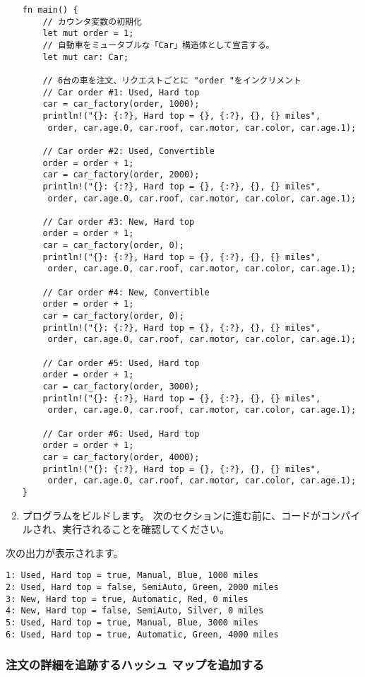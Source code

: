\begin{enumerate}
\begin{lstlisting}[numbers=none]
fn main() {
    // カウンタ変数の初期化
    let mut order = 1;
    // 自動車をミュータブルな「Car」構造体として宣言する。
    let mut car: Car;

    // 6台の車を注文、リクエストごとに "order "をインクリメント
    // Car order #1: Used, Hard top
    car = car_factory(order, 1000);
    println!("{}: {:?}, Hard top = {}, {:?}, {}, {} miles",
     order, car.age.0, car.roof, car.motor, car.color, car.age.1);

    // Car order #2: Used, Convertible
    order = order + 1;
    car = car_factory(order, 2000);
    println!("{}: {:?}, Hard top = {}, {:?}, {}, {} miles",
     order, car.age.0, car.roof, car.motor, car.color, car.age.1);    

    // Car order #3: New, Hard top
    order = order + 1;
    car = car_factory(order, 0);
    println!("{}: {:?}, Hard top = {}, {:?}, {}, {} miles",
     order, car.age.0, car.roof, car.motor, car.color, car.age.1);

    // Car order #4: New, Convertible
    order = order + 1;
    car = car_factory(order, 0);
    println!("{}: {:?}, Hard top = {}, {:?}, {}, {} miles",
     order, car.age.0, car.roof, car.motor, car.color, car.age.1);

    // Car order #5: Used, Hard top
    order = order + 1;
    car = car_factory(order, 3000);
    println!("{}: {:?}, Hard top = {}, {:?}, {}, {} miles",
     order, car.age.0, car.roof, car.motor, car.color, car.age.1);

    // Car order #6: Used, Hard top
    order = order + 1;
    car = car_factory(order, 4000);
    println!("{}: {:?}, Hard top = {}, {:?}, {}, {} miles",
     order, car.age.0, car.roof, car.motor, car.color, car.age.1);
}
\end{lstlisting}

\item プログラムをビルドします。 次のセクションに進む前に、コードがコンパイルされ、実行されることを確認してください。
\end{enumerate}


次の出力が表示されます。


\begin{lstlisting}[numbers=none]
1: Used, Hard top = true, Manual, Blue, 1000 miles
2: Used, Hard top = false, SemiAuto, Green, 2000 miles
3: New, Hard top = true, Automatic, Red, 0 miles
4: New, Hard top = false, SemiAuto, Silver, 0 miles
5: Used, Hard top = true, Manual, Blue, 3000 miles
6: Used, Hard top = true, Automatic, Green, 4000 miles
\end{lstlisting}

\subsubsection{注文の詳細を追跡するハッシュ マップを追加する}

